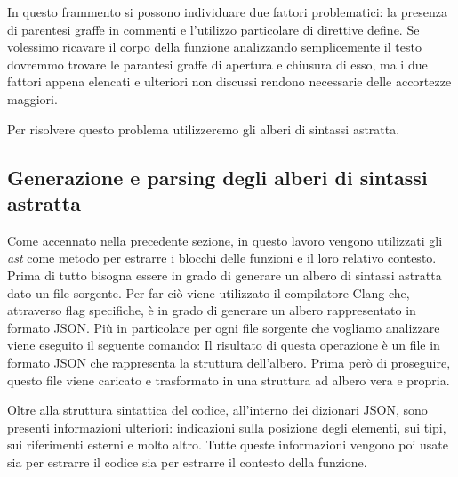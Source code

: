 \begin{code}[language=c++, caption={Esempio di codice valido con struttura particolare}, label={code:esempio_codice_complesso}]
  #DEFINE OPENBRACKET {
  #DEFINE CLOSEBRACKET }
  void foo()OPENBRACKET
    int error = 5 / 0; // Linea contente l'errore

    /* Questo commento rende difficile l'individuazione del corpo della funzione }
    */

  CLOSEBRACKET
\end{code}
In questo frammento si possono individuare due fattori problematici: la presenza di parentesi graffe in commenti e l'utilizzo particolare di direttive define.
Se volessimo ricavare il corpo della funzione analizzando semplicemente il testo dovremmo trovare le parantesi graffe di apertura e chiusura di esso, ma i due fattori appena elencati e ulteriori non discussi rendono necessarie delle accortezze maggiori. 

Per risolvere questo problema utilizzeremo gli alberi di sintassi astratta.

\subsection{Generazione e parsing degli alberi di sintassi astratta}
Come accennato nella precedente sezione, in questo lavoro vengono utilizzati gli \textit{ast} come metodo per estrarre i blocchi delle funzioni e il loro relativo contesto.
Prima di tutto bisogna essere in grado di generare un albero di sintassi astratta dato un file sorgente.
Per far ciò viene utilizzato il compilatore Clang che, attraverso flag specifiche, è in grado di generare un albero rappresentato in formato JSON.
Più in particolare per ogni file sorgente che vogliamo analizzare viene eseguito il seguente comando:
Il risultato di questa operazione è un file in formato JSON che rappresenta la struttura dell'albero.
Prima però di proseguire, questo file viene caricato e trasformato in una struttura ad albero vera e propria.

Oltre alla struttura sintattica del codice, all'interno dei dizionari JSON, sono presenti informazioni ulteriori: indicazioni sulla posizione degli elementi, sui tipi, sui riferimenti esterni e molto altro.
Tutte queste informazioni vengono poi usate sia per estrarre il codice sia per estrarre il contesto della funzione. 

